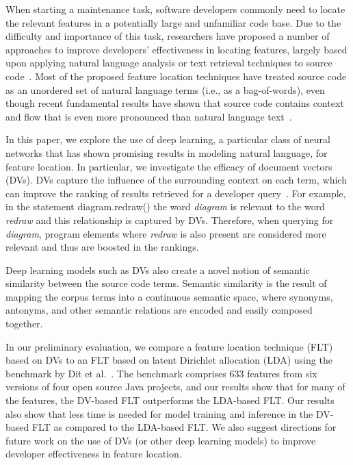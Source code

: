 
% 
%
When starting a maintenance task, software developers commonly need to
locate the relevant features in a potentially large and unfamiliar
code base. Due to the difficulty and importance of this task,
researchers have proposed a number of approaches to improve
developers' effectiveness in locating features, largely based upon
applying natural language analysis or text retrieval techniques to source
code~\cite{dit_feature_2013}. Most of the proposed feature location
techniques have treated source code as an unordered set of natural
language terms (i.e., as a bag-of-words), even though recent fundamental
results have shown that source code contains context and flow that is
even more pronounced than natural language
text~\cite{hindle_naturalness_2012}.


%
%
In this paper, we explore the use of deep learning, a particular class of neural networks that has shown promising
results in modeling natural language, for feature location. In
particular, we investigate the efficacy of document
vectors~\cite{le_distributed_2014} (DVs). DVs capture the
influence of the surrounding context on each term, which can improve the ranking
of results retrieved for a developer query~\cite{hill_use_2014}. For example, in the
statement {\sf diagram.redraw()} the word {\em diagram} is relevant to the word
{\em redraw} and this relationship is captured by DVs. Therefore, when querying for {\em diagram}, program elements
where {\em redraw} is also present are considered more relevant and thus are boosted in the rankings.

Deep learning models such as DVs also create a novel notion
of semantic similarity between the source code terms. Semantic
similarity is the result of mapping the corpus terms into a continuous
semantic space, where synonyms, antonyms, and other semantic relations
are encoded and easily composed together.


%
%

In our preliminary evaluation, we compare a feature location technique (FLT) based on DVs to an FLT based on latent Dirichlet allocation (LDA) using the benchmark by Dit et al.~\cite{Dit-etal_2013}.
The benchmark comprises 633 features from six versions of four open source Java projects, and our results show that for many of the features, the DV-based FLT outperforms the LDA-based FLT.
Our results also show that less time is needed for model training and inference in the DV-based FLT as compared to the LDA-based FLT.
We also suggest directions for future work on the use
of DVs (or other deep learning models) to improve developer effectiveness in feature location.



